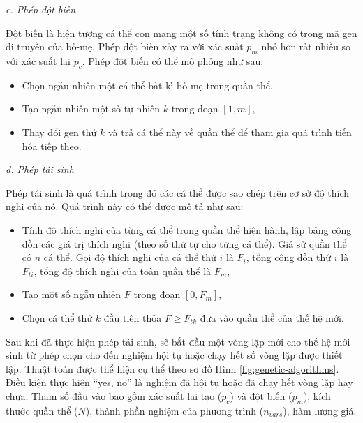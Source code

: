 \documentclass[12pt,a4paper]{report}
\begin{document}
\textit{c. Phép đột biến}

Đột biến là hiện tượng cá thể con mang một số tính trạng không có trong mã gen di truyền của bố-mẹ. Phép đột biến xảy ra với xác suất $p_m$ nhỏ hơn rất nhiều so với xác suất lai $p_c$. Phép đột biến có thể mô phỏng như sau:
	\begin{itemize}
		\item Chọn ngẫu nhiên một cá thể bất kì bố-mẹ trong quần thể,
		\item Tạo ngẫu nhiên một số tự nhiên $k$ trong đoạn $[1, m]$,
		\item Thay đổi gen thứ $k$ và trả cá thể này về quần thể để tham gia quá trình tiến hóa tiếp theo.
	\end{itemize}

\textit{d. Phép tái sinh}

Phép tái sinh là quá trình trong đó các cá thể được sao chép trên cơ sở độ thích nghi của nó. Quá trình này có thể được mô tả như sau:
	\begin{itemize}
		\item Tính độ thích nghi của từng cá thể trong quần thể hiện hành, lập bảng cộng dồn các giá trị thích nghi (theo số thứ tự cho từng cá thể). Giả sử quần thể có $n$ cá thể. Gọi độ thích nghi của cá thể thứ $i$ là $F_i$, tổng cộng dồn thứ $i$ là $F_{ti}$, tổng độ thích nghi của toàn quần thể là $F_{m}$,
		\item Tạo một số ngẫu nhiên $F$ trong đoạn $[0, F_m]$,
		\item Chọn cá thể thứ $k$ đầu tiên thỏa $F \geq F_{tk}$ đưa vào quần thể của thế hệ mới.
	\end{itemize}

Sau khi đã thực hiện phép tái sinh, sẽ bắt đầu một vòng lặp mới cho thế hệ mới sinh từ phép chọn cho đến nghiệm hội tụ hoặc chạy hết số vòng lặp được thiết lập. Thuật toán được thể hiện cụ thể theo sơ đồ Hình \ref{fig:genetic-algorithms}. Điều kiện thực hiện ``yes, no'' là nghiệm đã hội tụ hoặc đã chạy hết vòng lặp hay chưa. Tham số đầu vào bao gồm xác suất lai tạo ($p_c$) và đột biến ($p_m$), kích thước quần thể ($N$), thành phần nghiệm của phương trình ($n_{vars}$), hàm lượng giá.
\end{document}
